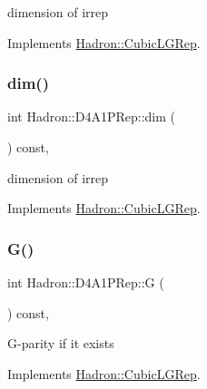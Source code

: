 dimension of irrep 

Implements \mbox{\hyperlink{structHadron_1_1CubicLGRep_a3acbaea26503ed64f20df693a48e4cdd}{Hadron\+::\+Cubic\+L\+G\+Rep}}.

\mbox{\label{structHadron_1_1D4A1PRep_a3b84dbb23476d76b192c0440aafb9e92}} 
\subsubsection{\texorpdfstring{dim()}{dim()}\hspace{0.1cm}{\footnotesize\ttfamily [2/2]}}
{\footnotesize\ttfamily int Hadron\+::\+D4\+A1\+P\+Rep\+::dim (\begin{DoxyParamCaption}{ }\end{DoxyParamCaption}) const\hspace{0.3cm}{\ttfamily [inline]}, {\ttfamily [virtual]}}

dimension of irrep 

Implements \mbox{\hyperlink{structHadron_1_1CubicLGRep_a3acbaea26503ed64f20df693a48e4cdd}{Hadron\+::\+Cubic\+L\+G\+Rep}}.

\mbox{\label{structHadron_1_1D4A1PRep_a51171e5c1f09171ff0bde566898e5780}} 
\subsubsection{\texorpdfstring{G()}{G()}\hspace{0.1cm}{\footnotesize\ttfamily [1/2]}}
{\footnotesize\ttfamily int Hadron\+::\+D4\+A1\+P\+Rep\+::G (\begin{DoxyParamCaption}{ }\end{DoxyParamCaption}) const\hspace{0.3cm}{\ttfamily [inline]}, {\ttfamily [virtual]}}

G-\/parity if it exists 

Implements \mbox{\hyperlink{structHadron_1_1CubicLGRep_ace26f7b2d55e3a668a14cb9026da5231}{Hadron\+::\+Cubic\+L\+G\+Rep}}.

\mbox{\label{structHadron_1_1D4A1PRep_a51171e5c1f09171ff0bde566898e5780}} 

